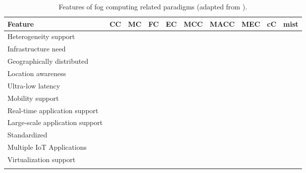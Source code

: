 \begin{table}[!t]
	\scriptsize
	\begin{tabular*}{\textwidth}{l >{\centering\arraybackslash}m{0.4in} >{\centering\arraybackslash}m{0.4in} >{\centering\arraybackslash}m{0.4in} >{\centering\arraybackslash}m{0.4in} >{\centering\arraybackslash}m{0.4in} >{\centering\arraybackslash}m{0.4in} >{\centering\arraybackslash}m{0.4in} >{\centering\arraybackslash}m{0.4in} >{\centering\arraybackslash}m{0.4in}}
		\toprule
		\centering\textbf{Feature} & \textbf{CC} & \textbf{MC} & \textbf{FC} & \textbf{EC} & \textbf{MCC} & \textbf{MACC} & \textbf{MEC} & \textbf{cC} & \textbf{mist} \\[2pt]
		\toprule
		Heterogeneity support & \cmark &  & \cmark & \cmark & \cmark &  &  &  & \cmark \\ \midrule
		Infrastructure need & \cmark &  & \cmark & \cmark & \cmark &  & \cmark & \cmark & \cmark \\ \midrule
		Geographically distributed &  &  & \cmark & \cmark &  &  & \cmark & \cmark & \cmark \\ \midrule
		Location awareness &  & \cmark & \cmark & \cmark &  & \cmark & \cmark & \cmark & \cmark \\ \midrule
		Ultra-low latency &  &  & \cmark & \cmark &  &  & \cmark & \cmark & \cmark \\ \midrule
		Mobility support &  & \cmark & \cmark & \cmark & \cmark & \cmark & \cmark & \cmark & \cmark \\ \midrule
		Real-time application support &  &  & \cmark & \cmark &  &  & \cmark & \cmark & \cmark \\ \midrule
		Large-scale application support & \cmark &  & \cmark & \cmark &  &  & \cmark &  & \cmark \\ \midrule
		Standardized & \cmark & \cmark & \cmark & \cmark &  &  & \cmark &  &  \\ \midrule
		Multiple IoT Applications & \cmark &  & \cmark &  &  &  &  & \cmark & \cmark \\ \midrule
		Virtualization support & \cmark &  & \cmark &  &  &  & \cmark & \cmark &  \\ \bottomrule \\
	\end{tabular*}
	\caption{Features of fog computing related paradigms (adapted from \cite{yousefpour2018all}).}
	\label{computing_paradigms}
	\vspace{-5mm}
\end{table}